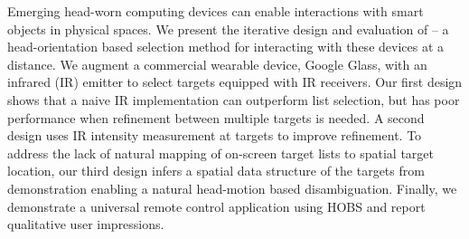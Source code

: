 
Emerging head-worn computing devices can enable interactions with smart objects in physical spaces. 
%
We present the iterative design and evaluation of \systemname -- a head-orientation based selection method for interacting with these devices at a distance. We augment a commercial wearable device, Google Glass, with an infrared (IR) emitter to select targets equipped with IR receivers. Our first design shows that a naive IR implementation can outperform list selection, but has poor performance when refinement between multiple targets is needed. A second design uses IR intensity measurement at targets to improve refinement. To address the lack of natural mapping of on-screen target lists to spatial target location, our third design infers a spatial data structure of the targets from demonstration enabling a natural head-motion based disambiguation.
%
Finally, we demonstrate a universal remote control application using HOBS and report qualitative user impressions.
